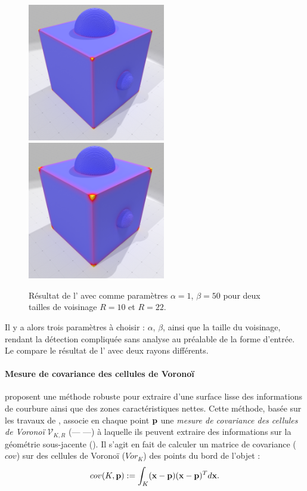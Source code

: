 \begin{figure}[hbt]
  \centering
  \includegraphics[height=6cm]{images/Feature/CubeSphere_Moments_r_10_c1}
  \includegraphics[height=6cm]{images/Feature/CubeSphere_Moments_r_22_c1}
  \caption[Résultat de l']{Résultat de l' avec comme paramètres $\alpha = 1$, $\beta = 50$ pour deux tailles de voisinage $R = 10$ et $R = 22$.}\label{fig:moment-C1}
\end{figure}

Il y a alors trois paramètres à choisir : $\alpha$, $\beta$, ainsi que la
taille du voisinage, rendant la détection compliquée sans analyse au préalable
de la forme d'entrée. Le  compare le résultat de l' avec deux rayons différents.
%
\paragraph{Mesure de covariance des cellules de Voronoï}
%
 proposent une méthode robuste pour extraire
d'une surface lisse des informations de courbure ainsi que des zones
caractéristiques nettes. Cette méthode, basée sur les travaux de
, associe en chaque point $\mathbf{p}$ une \emph{mesure de
covariance des cellules de Voronoï} $\mathcal{V}_{K,R}$ (\VCMM --- \VCM ---) à
laquelle ils peuvent extraire des informations sur la géométrie sous-jacente
(). Il s'agit en fait de calculer un matrice de
covariance ($cov$) sur des cellules de Voronoï ($Vor_K$) des points du bord de
l'objet :
%
\begin{equation}
    cov(K,\mathbf{p}) := \int_K (\mathbf{x} - \mathbf{p})(\mathbf{x} - \mathbf{p})^T d\mathbf{x} .
\end{equation}

